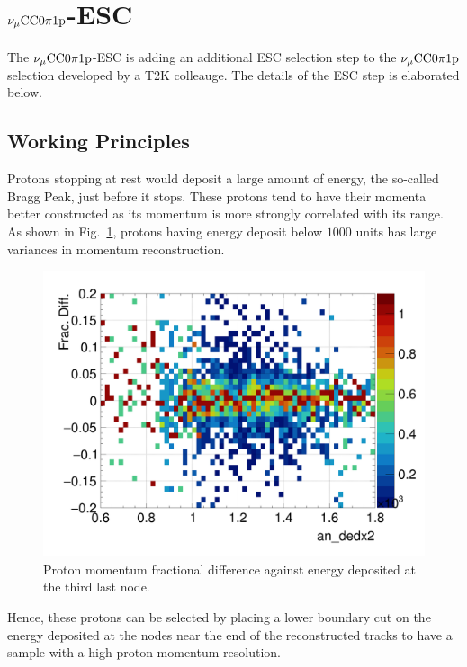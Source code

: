 \section{$\nu_{\mu}\textrm{CC}0\pi1\textrm{p}$-ESC}
     The $\nu_{\mu}\textrm{CC}0\pi1\textrm{p}$-ESC is adding an additional ESC selection step to the $\nu_{\mu}\textrm{CC}0\pi1\textrm{p}$ selection developed by a T2K colleauge.
     The details of the ESC step is elaborated below.
    \subsection{Working Principles}
    Protons stopping at rest would deposit a large amount of energy, the so-called Bragg Peak, just before it stops.
    These protons tend to have their momenta better constructed as its momentum is more strongly correlated with its range. 
    As shown in Fig.~\ref{fig:dedx-pprres-eg}, protons having energy deposit below $1000$ units has large variances in momentum reconstruction. 
    \begin{figure}[h]
        \centering
        \includegraphics[width=0.5\linewidth]{figures/sel/an_dedx2_colnor_vs_p_pr_res_hist2d_al12_zoom.png}
        \caption{Proton momentum fractional difference against energy deposited at the third last node.}
        \label{fig:dedx-pprres-eg}
    \end{figure}
    Hence, these protons can be selected by placing a lower boundary cut on the energy deposited at the nodes near the end of the reconstructed tracks to have a sample with a high proton momentum resolution.   
    

